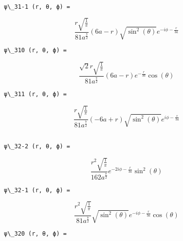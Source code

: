 \documentclass[11pt]{article}
\begin{document}
    
    \begin{Verbatim}[commandchars=\\\{\}]

ψ\_31-1 (r, θ, ϕ) =

    \end{Verbatim}

    $$\frac{r \sqrt{\frac{1}{\pi}}}{81 a^{\frac{7}{2}}} \left(6 a - r\right) \sqrt{\sin^{2}{\left (\theta \right )}} e^{- i \phi - \frac{r}{3 a}}$$

    
    \begin{Verbatim}[commandchars=\\\{\}]
ψ\_310 (r, θ, ϕ) =

    \end{Verbatim}

    $$\frac{\sqrt{2} r \sqrt{\frac{1}{\pi}}}{81 a^{\frac{7}{2}}} \left(6 a - r\right) e^{- \frac{r}{3 a}} \cos{\left (\theta \right )}$$

    
    \begin{Verbatim}[commandchars=\\\{\}]
ψ\_311 (r, θ, ϕ) =

    \end{Verbatim}

    $$\frac{r \sqrt{\frac{1}{\pi}}}{81 a^{\frac{7}{2}}} \left(- 6 a + r\right) \sqrt{\sin^{2}{\left (\theta \right )}} e^{i \phi - \frac{r}{3 a}}$$

    
    \begin{Verbatim}[commandchars=\\\{\}]

ψ\_32-2 (r, θ, ϕ) =

    \end{Verbatim}

    $$\frac{r^{2} \sqrt{\frac{1}{\pi}}}{162 a^{\frac{7}{2}}} e^{- 2 i \phi - \frac{r}{3 a}} \sin^{2}{\left (\theta \right )}$$

    
    \begin{Verbatim}[commandchars=\\\{\}]
ψ\_32-1 (r, θ, ϕ) =

    \end{Verbatim}

    $$\frac{r^{2} \sqrt{\frac{1}{\pi}}}{81 a^{\frac{7}{2}}} \sqrt{\sin^{2}{\left (\theta \right )}} e^{- i \phi - \frac{r}{3 a}} \cos{\left (\theta \right )}$$

    
    \begin{Verbatim}[commandchars=\\\{\}]
ψ\_320 (r, θ, ϕ) =

    \end{Verbatim}
\end{document}
